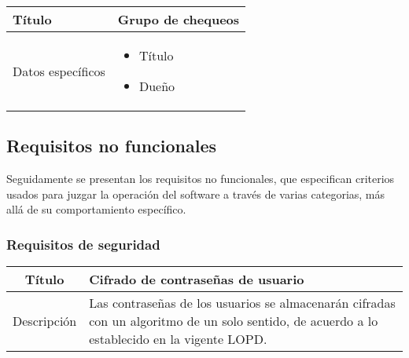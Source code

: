 \begin{center}
  
  \begin{tabularx}{\textwidth}{|l|X|}
    \hline

    Título & Grupo de chequeos \\

    \hline
    Datos específicos &

    \begin{itemize}
      \item Título
      \item Dueño
    \end{itemize}
    \\
    
    \hline
    
  \end{tabularx}
\end{center}

\FloatBarrier
\subsection{Requisitos no funcionales}

Seguidamente se presentan los requisitos no funcionales, que especifican
criterios usados para juzgar la operación del software a través de varias
categorias, más allá de su comportamiento específico.

\subsubsection{Requisitos de seguridad}

\begin{center}
  
  \begin{tabularx}{\textwidth}{|c|X|}
    \hline
    Título & Cifrado de contraseñas de usuario \\

    \hline

    Descripción & Las contraseñas de los usuarios se almacenarán cifradas con un
    algoritmo de un solo sentido, de acuerdo a lo establecido en la vigente \ac{LOPD}. \\


    \hline
  \end{tabularx}
\end{center}

